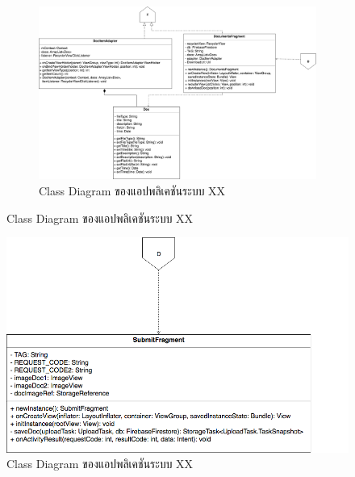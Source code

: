 \begin{figure}
	\begin{figure}[H]
		\includegraphics[width=1.0\columnwidth]{Figures/3/Class/Doc}
		\caption{Class Diagram ของแอปพลิเคชันระบบ XX}
		\label{Fig:DocC}
	\end{figure}
\end{figure}
	\begin{figure}[H]
		\includegraphics[width=\columnwidth]{Figures/3/Class/Submit}
		\caption{Class Diagram ของแอปพลิเคชันระบบ XX}
		\label{Fig:SubmitC}
	\end{figure}
